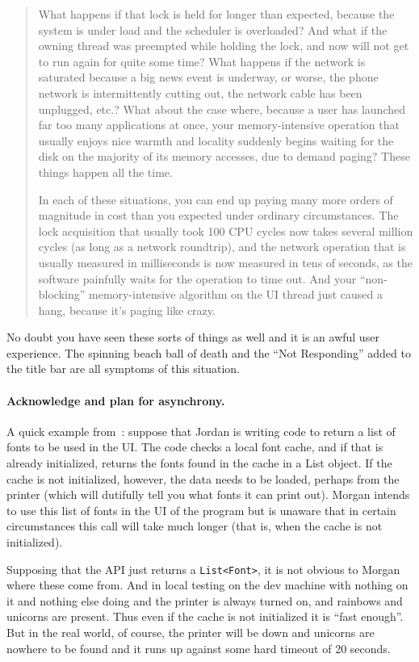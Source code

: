 \documentclass[a4paper]{report}
\begin{document}
\begin{quote}
What happens if that lock is held for longer than expected, because the system is under load and the scheduler is overloaded? And what if the owning thread was preempted while holding the lock, and now will not get to run again for quite some time? What happens if the network is saturated because a big news event is underway, or worse, the phone network is intermittently cutting out, the network cable has been unplugged, etc.? What about the case where, because a user has launched far too many applications at once, your memory-intensive operation that usually enjoys nice warmth and locality suddenly begins waiting for the disk on the majority of its memory accesses, due to demand paging? These things happen all the time.

In each of these situations, you can end up paying many more orders of magnitude in cost than you expected under ordinary circumstances. The lock acquisition that usually took 100 CPU cycles now takes several million cycles (as long as a network roundtrip), and the network operation that is usually measured in milliseconds is now measured in tens of seconds, as the software painfully waits for the operation to time out. And your ``non-blocking'' memory-intensive algorithm on the UI thread just caused a hang, because it's paging like crazy.
\end{quote}

No doubt you have seen these sorts of things as well and it is an awful user experience. The spinning beach ball of death and the ``Not Responding'' added to the title bar are all symptoms of this situation. 

\paragraph{Acknowledge and plan for asynchrony.} A quick example from~\cite{preopt}: suppose that Jordan is writing code to return a list of fonts to be used in the UI. The code checks a local font cache, and if that is already initialized, returns the fonts found in the cache in a List object. If the cache is not initialized, however, the data needs to be loaded, perhaps from the printer (which will dutifully tell you what fonts it can print out). Morgan intends to use this list of fonts in the UI of the program but is unaware that in certain circumstances this call will take much longer (that is, when the cache is not initialized).

Supposing that the API just returns a \texttt{List<Font>}, it is not obvious to Morgan where these come from. And in local testing on the dev machine with nothing on it and nothing else doing and the printer is always turned on, and rainbows and unicorns are present. Thus even if the cache is not initialized it is ``fast enough''. But in the real world, of course, the printer will be down and unicorns are nowhere to be found and it runs up against some hard timeout of 20 seconds. 
\end{document}
